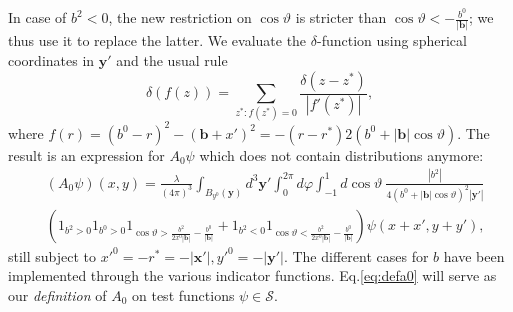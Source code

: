 \documentclass[b5paper,draft,openbib,12pt]{memoir}
\newcommand{\vx}{\mathbf{x}}
\newcommand{\vy}{\mathbf{y}}
\newcommand{\vb}{\mathbf{b}}
\begin{document}
In case of $b^2<0$, the new restriction on \(\cos\vartheta\) is 
stricter than \(\cos\vartheta<-\frac{b^0}{|\vb|}\); we thus use it 
to replace the latter. We evaluate the $\delta$-function using 
spherical coordinates in $\vy'$ and the usual rule
\begin{equation}\label{split delta}
    \delta(f(z))=\sum_{z^* : f(z^*)=0} \frac{\delta(z-z^*)}{|f'(z^*)|},
\end{equation}
where \(f(r)=(b^0-r)^2-(\vb+x')^2= -(r-r^*)2(b^0+|\vb|\cos\vartheta) \). 
The result is an expression for \(A_0\psi\) which does not contain 
distributions anymore:
\begin{align}\nonumber
    &(A_0\psi)(x,y)=\frac{\lambda}{(4\pi)^3}\int_{B_{y^0}(\vy)}d^3\vy'  \int_0^{2\pi}d\varphi \int_{-1}^{1} d\!\cos\vartheta ~\frac{|b^2|}{4(b^0+|\vb|\cos\vartheta)^2 |\vy'|} \\
    &\left(\!1_{b^2>0}1_{b^0>0} 1_{\cos\vartheta > \frac{b^2}{2x^0|\vb|} - \frac{b^0}{|\vb|}}\!\!+1_{b^2<0}1_{\cos\vartheta<\frac{b^2}{2x^0|\vb|} - \frac{b^0}{|\vb|}}\!\right)\!\psi(x+\!x',y+\!y'),
\label{eq:defa0}
\end{align}
still subject to \(x'^0=-r^*=-|\vx'| , {y'}^0=-|\vy'|\). The 
different cases for $b$ have been implemented through the various 
indicator functions. Eq.\@ \eqref{eq:defa0} will serve as our 
\textit{definition} of $A_0$ on test functions $\psi \in \mathcal{S}$.

\end{document}

